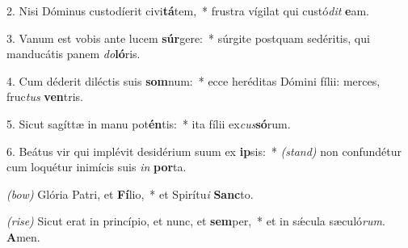 2. Nisi Dóminus custodíerit civi\textbf{tá}tem,~* frustra vígilat qui custó\textit{dit} \textbf{e}am.

3. Vanum est vobis ante lucem \textbf{súr}gere:~* súrgite postquam sedéritis, qui manducátis panem \textit{do}\textbf{ló}ris.

4. Cum déderit diléctis suis \textbf{som}\-num:~* ecce heréditas Dómini fílii: merces, fruc\textit{tus} \textbf{ven}tris.

5. Sicut sagíttæ in manu pot\textbf{én}tis:~* ita fílii ex\textit{cus}\textbf{só}rum.

6. Beátus vir qui implévit desidérium suum ex \textbf{ip}sis:~* {\color{red}\textit{(stand)}} non confundétur cum loquétur inimícis suis \textit{in} \textbf{por}ta.

{\color{red}\textit{(bow)}} Glória Patri, et \textbf{Fí}lio,~* et Spirítu\textit{i} \textbf{Sanc}to.

{\color{red}\textit{(rise)}} Sicut erat in princípio, et nunc, et \textbf{sem}per,~* et in s\'{\ae}cula sæculó\textit{rum}. \textbf{A}men.